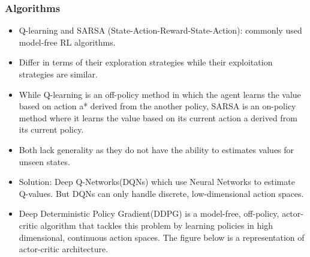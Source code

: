 \begin{frame}[fragile]\frametitle{Algorithms}

\begin{itemize}
\item Q-learning and SARSA (State-Action-Reward-State-Action): commonly used model-free RL algorithms. 
\item Differ in terms of their exploration strategies while their exploitation strategies are similar. 
\item While Q-learning is an off-policy method in which the agent learns the value based on action a* derived from the another policy, SARSA is an on-policy method where it learns the value based on its current action a derived from its current policy.
\item Both lack generality as they do not have the ability to estimates values for unseen states.
\item Solution:  Deep Q-Networks(DQNs) which use Neural Networks to estimate Q-values. But DQNs can only handle discrete, low-dimensional action spaces.
\item Deep Deterministic Policy Gradient(DDPG) is a model-free, off-policy, actor-critic algorithm that tackles this problem by learning policies in high dimensional, continuous action spaces. The figure below is a representation of actor-critic architecture.
\end{itemize}




\end{frame}


